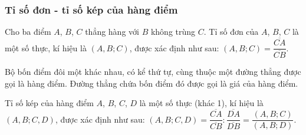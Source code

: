\documentclass{article} %
\begin{document}
    \subsubsection*{Tỉ số đơn - tỉ số kép của hàng điểm}

        \begin{definition}
            Cho ba điểm \(A\), \(B\), \(C\) thẳng hàng với \(B\) không trùng \(C\). Tỉ số đơn của \(A\), \(B\), \(C\) là một số thực, kí hiệu là \((A,B;C)\), được xác định như sau: \((A,B;C) = \dfrac{\overline{CA}}{\overline{CB}}\). 
        \end{definition}

        \begin{definition}
            Bộ bốn điểm đôi một khác nhau, có kể thứ tự, cùng thuộc một đường thẳng được gọi là hàng điểm. Đường thẳng chứa bốn điểm đó được gọi là giá của hàng điểm.
        \end{definition}

        \begin{definition}
            Tỉ số kép của hàng điểm \(A\), \(B\), \(C\), \(D\) là một số thực (khác 1), kí hiệu là \((A,B;C,D)\), được xác định như sau: \((A,B;C,D) = \dfrac{\overline{CA}}{\overline{CB}} : \dfrac{\overline{DA}}{\overline{DB}} = \dfrac{(A,B;C)}{(A,B;D)}\).
        \end{definition}

        \begin{center}
        \end{center}
\end{document}
